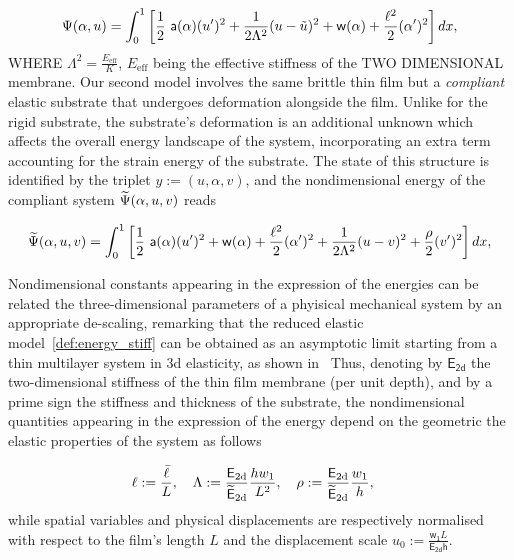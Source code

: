\begin{equation}
    \label{def:energy_stiff}
    \Psi(\alpha, u) = \int_{0}^{1} \left[ \frac{1}{2} \ \soften(\alpha)(u')^2 
    + \frac{1}{2 \elastell^2} (u-\subsu)^2
    + \homogdiss(\alpha) + \frac{\damagell^2}{2}(\alpha')^2 
     \right] dx,
\end{equation}
WHERE $\Lambda^2 = \frac{E_{\text{eff}}}{K}$, $E_{\text{eff}}$ being the effective stiffness of the TWO DIMENSIONAL membrane.
Our second model involves the same brittle thin film but a \emph{compliant} elastic substrate that undergoes deformation alongside the film. Unlike for the rigid substrate, the substrate's deformation is an additional unknown which affects the overall energy landscape of the system, incorporating an extra term accounting for the strain energy of the substrate. 
The state of this structure is identified by the triplet $y:=(u, \alpha, v)$, and the nondimensional energy of the compliant system  $\widetilde\Psi(\alpha, u, v)$ reads

\begin{equation}
    \label{def:energy_compliant}
    \Ecompl(\alpha, u,  v) = \int_{0}^1 \left[ \frac{1}{2} \ \soften(\alpha)(u')^2 + \homogdiss(\alpha) + \frac{\damagell^2}{2}(\alpha')^2 
    + \frac{1}{2 \elastell^2} (u- v)^2 
    + \frac{\stiffratio}{2}  (v')^2 \right] dx,
\end{equation}



Nondimensional constants appearing in the expression of the energies can be related the three-dimensional parameters of a phyisical mechanical system by an appropriate de-scaling, remarking that the reduced elastic model~\eqref{def:energy_stiff} can be obtained as an asymptotic limit starting from a thin multilayer system in 3d elasticity, as shown in~\cite{Baldelli2015}
Thus, denoting by $\mathsf{E_\text{2d}}$ the two-dimensional stiffness of the thin film membrane (per unit depth), and by a prime sign the stiffness and thickness of the substrate, the nondimensional quantities appearing in the expression of the energy depend on the geometric the elastic properties of the system as follows

\begin{equation}
    \label{def:dimensional_parameters}
    \ell := \frac{\bar{\ell}}{L}, \quad
    \Lambda := \frac{\mathsf{E_{\text{2d}}}}{{\mathsf{\widetilde E_{\text{2d}}}}}\frac{h w_1}{L^2}, \quad
    \rho := \frac{\mathsf{E_{\text{2d}}}}{{\mathsf{\widetilde E_{\text{2d}}}}}\frac{w_1}{h}, \quad
\end{equation}
while spatial variables and physical displacements are respectively normalised with respect to the film's length $L$ and the displacement scale $u_0 := \frac{\mathsf{w_1}L}{\mathsf{E_{\text{2d}} h}}$.




